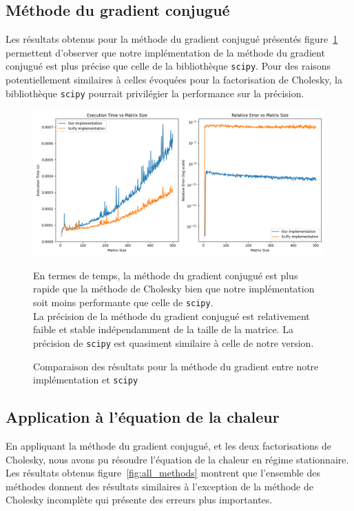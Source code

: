 \documentclass{article}
\begin{document}
\subsection{Méthode du gradient conjugué }
Les résultats obtenus pour la méthode du gradient conjugué présentés figure~\ref{fig:gradient_conjugue} permettent d'observer que notre implémentation de la méthode du gradient conjugué est plus précise que celle de la bibliothèque \texttt{scipy}. Pour des raisons potentiellement similaires à celles évoquées pour la factorisation de Cholesky, la bibliothèque \texttt{scipy} pourrait privilégier la performance sur la précision.
\begin{figure}[h!]
  \begin{minipage}{0.5\textwidth}
    \centering
    \includegraphics[width=\textwidth]{img/gradient_all.png}
    \caption{Comparaison des résultats pour la méthode du gradient entre notre implémentation et \texttt{scipy}}
    \label{fig:gradient_conjugue}
  \end{minipage}
  \hfill
  \begin{minipage}{0.45\textwidth}
    En termes de temps, la méthode du gradient conjugué est plus rapide que la méthode de Cholesky bien que notre implémentation soit moins performante que celle de \texttt{scipy}. \\
    La précision de la méthode du gradient conjugué est relativement faible et stable indépendamment de la taille de la matrice. La précision de \texttt{scipy} est quasiment similaire à celle de notre version.
  \end{minipage}
\end{figure}

\subsection{Application à l’équation de la chaleur}
En appliquant la méthode du gradient conjugué, et les deux factorisations de Cholesky, nous avons pu résoudre l'équation de la chaleur en régime stationnaire. Les résultats obtenus figure~\ref{fig:all_methods} montrent que l'ensemble des méthodes donnent des résultats similaires à l'exception de la méthode de Cholesky incomplète qui présente des erreurs plus importantes.
\end{document}
